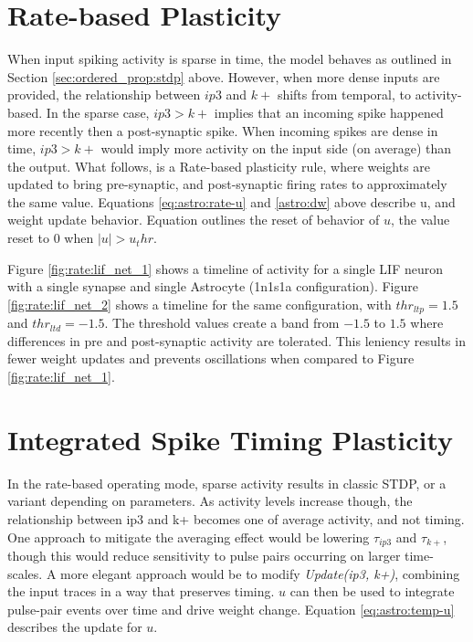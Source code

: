     \section{Rate-based Plasticity}

    When input spiking activity is sparse in time, the model behaves as outlined
    in Section \ref{sec:ordered_prop:stdp} above. However, when more dense
    inputs are provided, the relationship between $ip3$ and $k+$ shifts from
    temporal, to activity-based. In the sparse case, $ip3 > k+$ implies that an
    incoming spike happened more recently then a post-synaptic spike. When
    incoming spikes are dense in time, $ip3 > k+$ would imply more activity on
    the input side (on average) than the output. What follows, is a Rate-based
    plasticity rule, where weights are updated to bring pre-synaptic, and
    post-synaptic firing rates to approximately the same value. Equations
    \ref{eq:astro:rate-u} and \ref{astro:dw} above describe u, and
    weight update behavior. Equation \label{eq:astro:u-reset} outlines the reset
    of behavior of $u$, the value reset to $0$ when $|u| > u_thr$.

    Figure \ref{fig:rate:lif_net_1} shows a timeline of activity for a single
    LIF neuron with a single synapse and single Astrocyte (1n1s1a
    configuration). Figure \ref{fig:rate:lif_net_2} shows a timeline for the
    same configuration, with $thr_{ltp}=1.5$ and $thr_{ltd}=-1.5$. The threshold
    values create a band from $-1.5$ to $1.5$ where differences in pre and
    post-synaptic activity are tolerated. This leniency results in fewer weight
    updates and prevents oscillations when compared to Figure
    \ref{fig:rate:lif_net_1}.

    
    
 
    \section{Integrated Spike Timing Plasticity} \label{section:istp}
    
    In the rate-based operating mode, sparse activity results in classic STDP,
    or a variant depending on parameters. As activity levels increase though,
    the relationship between ip3 and k+ becomes one of average activity, and not
    timing. One approach to mitigate the averaging effect would be lowering
    $\tau_{ip3}$ and $\tau_{k+}$, though this would reduce sensitivity to pulse
    pairs occurring on larger time-scales. A more elegant approach would be to
    modify \emph{Update(ip3, k+)}, combining the input traces in a way that
    preserves timing. $u$ can then be used to integrate pulse-pair events over
    time and drive weight change. Equation \ref{eq:astro:temp-u} describes the
    update for $u$.

